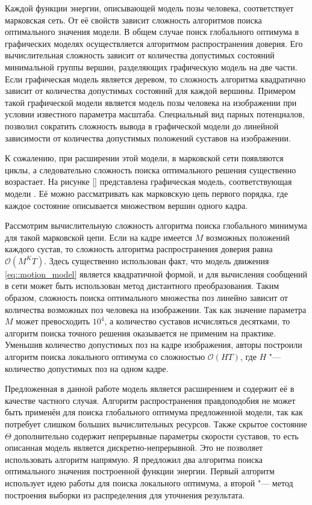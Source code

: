 Каждой функции энергии, описывающей модель позы человека, соответствует марковская сеть. От её свойств зависит сложность алгоритмов поиска оптимального значения модели. В общем случае поиск глобального оптимума в графических моделях осуществляется алгоритмом распространения доверия. Его вычислительная сложность зависит от количества допустимых состояний минимальной группы вершин, разделяющих графическую модель на две части. Если графическая модель является деревом, то сложность алгоритма квадратично зависит от количества допустимых состояний для каждой вершины. Примером такой графической модели является модель позы человека на изображении при условии известного параметра масштаба. Специальный вид парных потенциалов, позволил сократить сложность вывода в графической модели до линейной зависимости от количества допустимых положений суставов на изображении.

К сожалению, при расширении этой модели, в марковской сети появляются циклы, а следовательно сложность поиска оптимального решения существенно возрастает. На рисунке \ref{} представлена графическая модель, соответствующая модели \cite{park2011n}. Её можно рассматривать как марковскую цепь первого порядка, где каждое состояние описывается множеством вершин одного кадра.

Рассмотрим вычислительную сложность алгоритма поиска глобального минимума для такой марковской цепи. Если на кадре имеется $M$ возможных положений каждого сустав, то сложность алгоритма распространения доверия равна $\mathcal{O}(M^{K}T)$. Здесь существенно использован факт, что модель движения \eqref{eq::motion_model} является квадратичной формой, и для вычисления сообщений в сети может быть использован метод дистантного преобразования. Таким образом, сложность поиска оптимального множества поз линейно зависит от количества возможных поз человека на изображении. Так как значение параметра $M$ может превосходить $10^4$, а количество суставов исчисляться десятками, то алгоритм поиска точного решения оказывается не применим на практике. Уменьшив количество допустимых поз на кадре изображения, авторы \cite{park2011n} построили алгоритм поиска локального оптимума со сложностью $\mathcal{O}(HT)$, где $H$ "--- количество допустимых поз на одном кадре.

Предложенная в данной работе модель является расширением \cite{park2011n} и содержит её в качестве частного случая. Алгоритм распространения правдоподобия не может быть применён для поиска глобального оптимума предложенной модели, так как потребует слишком больших вычислительных ресурсов. Также скрытое состояние $\Theta$ дополнительно содержит непрерывные параметры скорости суставов, то есть описанная модель является дискретно-непрерывной. Это не позволяет использовать алгоритм \cite{park2011n} напрямую. Я предложил два алгоритма поиска оптимального значения построенной функции энергии. Первый алгоритм использует идею работы \cite{park2011n} для поиска локального оптимума, а второй "--- метод построения выборки из распределения для уточнения результата.

